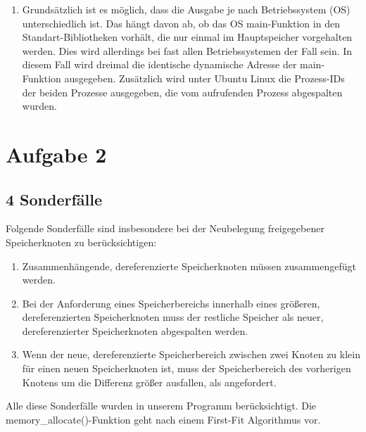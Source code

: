 \documentclass[numbers=noendperiod]{scrartcl}
\begin{document}
\begin{enumerate}[1.]
\begin{enumerate}
		\end{enumerate}
	
	\item Grundsätzlich ist es möglich, dass die Ausgabe je nach Betriebssystem (OS) unterschiedlich ist. Das hängt davon ab, ob das OS main-Funktion in den Standart-Bibliotheken vorhält, die nur einmal im Hauptspeicher vorgehalten werden. Dies wird allerdings bei fast allen Betriebssystemen der Fall sein. In diesem Fall wird dreimal die identische dynamische Adresse der main-Funktion ausgegeben. Zusätzlich wird unter Ubuntu Linux die Prozess-IDs der beiden Prozesse ausgegeben, die vom aufrufenden Prozess abgespalten wurden.

	
\end{enumerate}
\section{Aufgabe 2}
\subsection*{4 Sonderfälle}
Folgende Sonderfälle sind insbesondere bei der Neubelegung freigegebener Speicherknoten zu berücksichtigen:
\begin{enumerate}
	\item Zusammenhängende, dereferenzierte Speicherknoten müssen zusammengefügt werden.
	\item Bei der Anforderung eines Speicherbereichs innerhalb eines größeren, dereferenzierten Speicherknoten muss der restliche Speicher als neuer, dereferenzierter Speicherknoten abgespalten werden.
	\item Wenn der neue, dereferenzierte Speicherbereich zwischen zwei Knoten zu klein für einen neuen Speicherknoten ist, muss der Speicherbereich des vorherigen Knotens um die Differenz größer ausfallen, als angefordert.
\end{enumerate}
Alle diese Sonderfälle wurden in unserem Programm berücksichtigt. Die memory\_allocate()-Funktion geht nach einem First-Fit Algorithmus vor.
	
\end{document}
